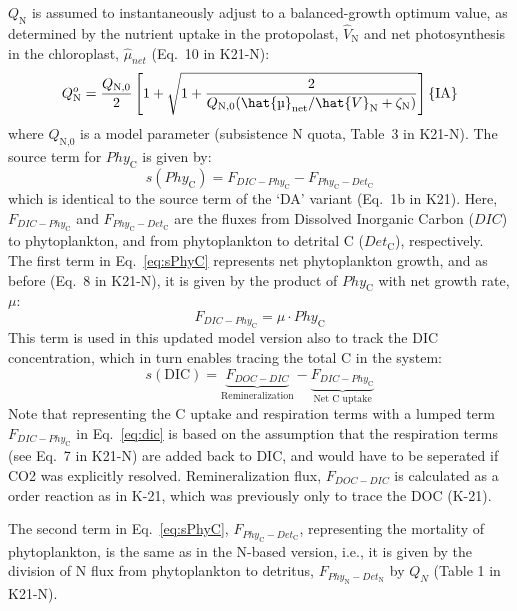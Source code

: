 \documentclass[gmd, manuscript]{copernicus}
\begin{document}
$Q_\text{N}$ is assumed to instantaneously adjust to a balanced-growth optimum value, as determined by the nutrient uptake in the protopolast, $\hat{V}_\text{N}$ and net photosynthesis in the chloroplast, $\hat{\mu}_{net}$ (Eq.~10 in K21-N):
\begin{equation}\label{eq:Qopt}
 Q_\text{N}^o= \frac{Q_\text{N,0}}{2} \left[1+\sqrt{1+\frac{2}{Q_\text{N,0}{({\hat{\mu}_{\text{net}}}/{\hat{V}_\text{N}}+\zeta_\text{N} )}}} \right] \hfill \{\text{IA}\}
\end{equation}
where $Q_\text{N,0}$ is a model parameter (subsistence N quota, Table~3 in K21-N). The source term for $Phy_\text{C}$ is given by:
\begin{equation} \label{eq:sPhyC}
s(Phy_{\text{C}}) = F_{DIC-Phy_\text{C}} - F_{Phy_{\text{C}}-Det_{\text{C}}}
\end{equation}
which is identical to the source term of the `DA' variant (Eq.~1b in K21). Here, $F_{DIC-Phy_\text{C}}$ and $F_{Phy_{\text{C}}-Det_{\text{C}}}$ are the fluxes from Dissolved Inorganic Carbon ($DIC$) to phytoplankton, and from phytoplankton to detrital C ($Det_\text{C}$), respectively. The first term in Eq.~\ref{eq:sPhyC} represents net phytoplankton growth, and as before (Eq.~8 in K21-N), it is given by the product of $Phy_\text{C}$ with net growth rate, $\mu$: 
\begin{equation} \label{eq:fdicphyc}
 F_{DIC-Phy_\text{C}} = \mu \cdot Phy_\text{C}
\end{equation}
This term is used in this updated model version also to track the DIC concentration, which in turn enables tracing the total C in the system:
\begin{equation} \label{eq:dic}
  s(\text{DIC}) = \underbrace{F_{DOC-DIC}}_\textrm{Remineralization} - \underbrace{F_{DIC-Phy_{\text{C}}}}_\textrm{Net C uptake}
\end{equation}
Note that representing the C uptake and respiration terms with a lumped term $F_{DIC-Phy_{\text{C}}}$ in Eq.~\ref{eq:dic} is based on the assumption that the respiration terms (see Eq.~7 in K21-N) are added back to DIC, and would have to be seperated if CO2 was explicitly resolved. Remineralization flux, $F_{DOC-DIC}$ is calculated as a order reaction as in K-21, which was previously only to trace the DOC (K-21).

The second term in Eq.~\ref{eq:sPhyC}, $F_{Phy_\text{C}-Det_\text{C}}$, representing the mortality of phytoplankton, is the same as in the N-based version, i.e., it is given by the division of N flux from phytoplankton to detritus, $F_{Phy_\text{N}-Det_\text{N}}$ by $Q_N$ (Table 1 in K21-N).
\end{document}
